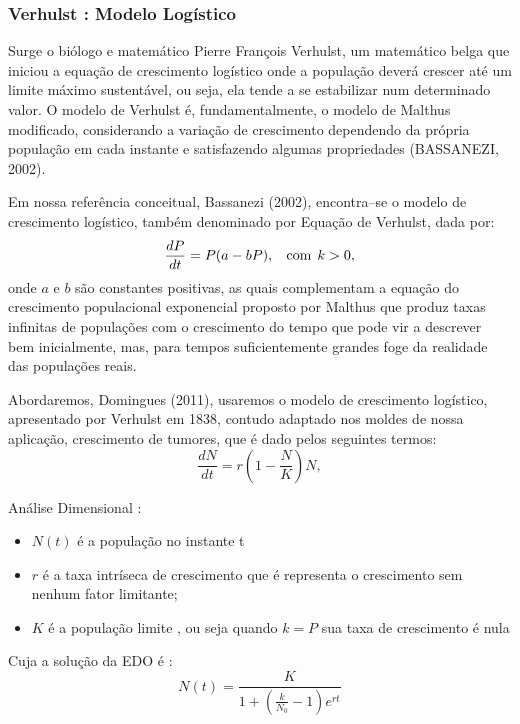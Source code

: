 \newpage
\subsubsection{Verhulst : Modelo Logístico}

Surge o biólogo e matemático Pierre François Verhulst, um matemático belga que iniciou a equação de crescimento logístico onde a população deverá crescer até um limite máximo sustentável, ou seja, ela tende a se estabilizar num determinado valor. O modelo de Verhulst é, fundamentalmente, o modelo de Malthus modificado, considerando a variação de crescimento dependendo da própria população em cada instante e satisfazendo algumas propriedades (BASSANEZI, 2002).

Em nossa referência conceitual, Bassanezi (2002), encontra--se o modelo de crescimento logístico, também denominado por Equação de Verhulst, dada por:
\begin{equation*}
\dfrac{dP}{dt} = P(a - bP),\hspace{2ex} \mbox{com}\hspace{1ex} k > 0,
\end{equation*}
onde $a$ e $b$ são constantes positivas, as quais complementam a equação do crescimento populacional exponencial proposto por Malthus que produz taxas infinitas de populações com o crescimento do tempo que pode vir a descrever bem inicialmente, mas, para tempos suficientemente grandes foge da realidade das populações reais.

Abordaremos, Domingues (2011), usaremos o modelo de crescimento logístico, apresentado por Verhulst em 1838, contudo adaptado nos moldes de nossa aplicação, crescimento de tumores, que é dado pelos seguintes termos:
\begin{equation*}
\dfrac{dN}{dt} = r \left(1 - \dfrac{N}{K}\right) N,
\end{equation*}

Análise Dimensional :
\begin{itemize}
    \item $N(t)$ é a população no instante t
    \item $r$ é a taxa intríseca de crescimento que é representa o crescimento sem nenhum fator limitante;
    \item $K$ é a população limite , ou seja quando $k=P$ sua taxa de crescimento é nula
\end{itemize}
Cuja a solução da EDO  é :
\begin{equation*}
    N(t)=\frac{K}{1+(\frac{k}{N_0}-1)e^{rt}}
\end{equation*}
    
